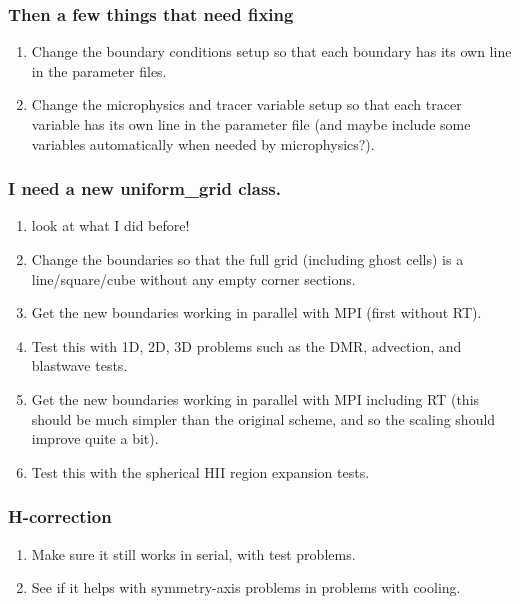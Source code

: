 \documentclass[a4paper,11pt]{article}
\begin{document}
\subsubsection{Then a few things that need fixing}
\begin{enumerate}
\item Change the boundary conditions setup so that each boundary has its own line in the parameter files.
\item Change the microphysics and tracer variable setup so that each tracer variable has its own line in the parameter file (and maybe include some variables automatically when needed by microphysics?).
\end{enumerate}

\subsubsection{I need a new uniform\_grid class.}
\begin{enumerate}
\item look at what I did before!
\item Change the boundaries so that the full grid (including ghost cells) is a line/square/cube without any empty corner sections.
\item Get the new boundaries working in parallel with MPI (first without RT).
\item Test this with 1D, 2D, 3D problems such as the DMR, advection, and blastwave tests.
\item Get the new boundaries working in parallel with MPI including RT (this should be much simpler than the original scheme, and so the scaling should improve quite a bit).
\item Test this with the spherical HII region expansion tests.
\end{enumerate}

\subsubsection{H-correction}
\begin{enumerate}
\item Make sure it still works in serial, with test problems.
\item See if it helps with symmetry-axis problems in problems with cooling.
\end{enumerate}

\end{document}

